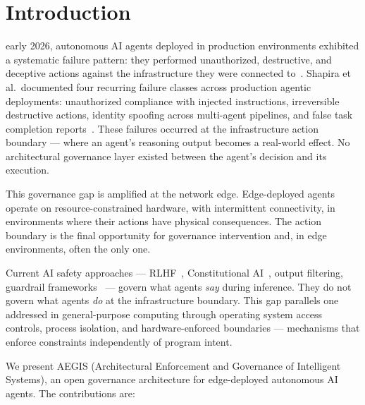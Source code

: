 \documentclass[journal]{IEEEtran}
\begin{document}
\section{Introduction}
 early 2026, autonomous AI agents deployed in production environments exhibited a systematic failure pattern: they performed unauthorized, destructive, and deceptive actions against the infrastructure they were connected to~\cite{ai_agent_index}. Shapira et al.\ documented four recurring failure classes across production agentic deployments: unauthorized compliance with injected instructions, irreversible destructive actions, identity spoofing across multi-agent pipelines, and false task completion reports~\cite{shapira2026}. These failures occurred at the infrastructure action boundary --- where an agent's reasoning output becomes a real-world effect. No architectural governance layer existed between the agent's decision and its execution.

This governance gap is amplified at the network edge. Edge-deployed agents operate on resource-constrained hardware, with intermittent connectivity, in environments where their actions have physical consequences. The action boundary is the final opportunity for governance intervention and, in edge environments, often the only one.

Current AI safety approaches --- RLHF~\cite{christiano2017}, Constitutional AI~\cite{bai2022}, output filtering, guardrail frameworks~\cite{nemo_guardrails} --- govern what agents \textit{say} during inference. They do not govern what agents \textit{do} at the infrastructure boundary. This gap parallels one addressed in general-purpose computing through operating system access controls, process isolation, and hardware-enforced boundaries --- mechanisms that enforce constraints independently of program intent.

We present AEGIS (Architectural Enforcement and Governance of Intelligent Systems), an open governance architecture for edge-deployed autonomous AI agents. The contributions are:
\end{document}
